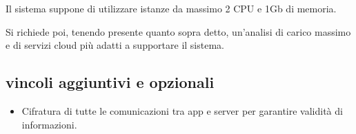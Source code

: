 Il sistema suppone di utilizzare istanze da massimo 2 CPU e 1Gb di memoria.

Si richiede poi, tenendo presente quanto sopra detto, un'analisi di carico massimo e di servizi cloud più adatti a supportare il sistema.

\subsection{vincoli aggiuntivi e opzionali}
\begin{itemize}
    \item Cifratura di tutte le comunicazioni tra app e server per garantire validità di informazioni.
\end{itemize}
